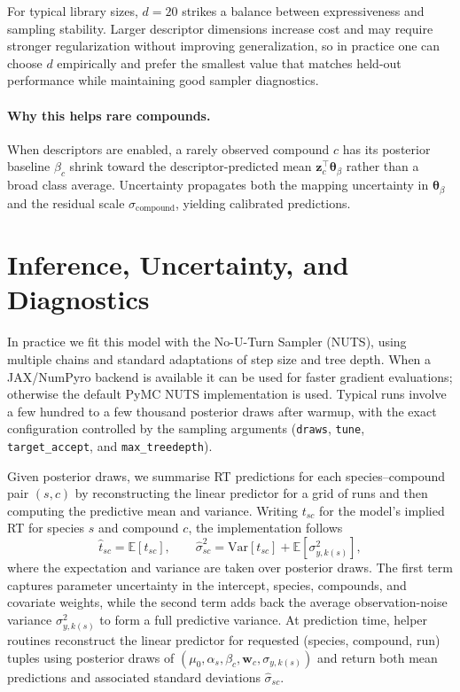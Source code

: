 \documentclass[11pt]{article}
\begin{document}
For typical library sizes, $d=20$ strikes a balance between expressiveness and sampling
stability. Larger descriptor dimensions increase cost and may require stronger
regularization without improving generalization, so in practice one can choose $d$
empirically and prefer the smallest value that matches held-out performance while
maintaining good sampler diagnostics.

\paragraph{Why this helps rare compounds.}
When descriptors are enabled, a rarely observed compound $c$ has its posterior
baseline $\beta_c$ shrink toward the descriptor-predicted mean
$\bm{z}_c^{\top}\bm{\theta}_\beta$ rather than a broad class average. Uncertainty
propagates both the mapping uncertainty in $\bm{\theta}_\beta$ and the residual scale
$\sigma_{\mathrm{compound}}$, yielding calibrated predictions.

\section{Inference, Uncertainty, and Diagnostics}

In practice we fit this model with the No-U-Turn Sampler (NUTS), using multiple chains
and standard adaptations of step size and tree depth. When a JAX/NumPyro backend is
available it can be used for faster gradient evaluations; otherwise the default PyMC
NUTS implementation is used. Typical runs involve a few hundred to a few thousand
posterior draws after warmup, with the exact configuration controlled by the sampling
arguments (\texttt{draws}, \texttt{tune}, \texttt{target\_accept}, and
\texttt{max\_treedepth}).

Given posterior draws, we summarise RT predictions for each species--compound pair
$(s,c)$ by reconstructing the linear predictor for a grid of runs and then computing
the predictive mean and variance. Writing $t_{sc}$ for the model's implied RT for
species $s$ and compound $c$, the implementation follows
\begin{equation}
  \hat{t}_{sc}=\mathbb{E}[t_{sc}],
  \qquad
  \hat{\sigma}^2_{sc}=\mathrm{Var}[t_{sc}]+\mathbb{E}[\sigma^2_{y,k(s)}],
\end{equation}
where the expectation and variance are taken over posterior draws. The first term
captures parameter uncertainty in the intercept, species, compounds, and covariate
weights, while the second term adds back the average observation-noise variance
$\sigma^2_{y,k(s)}$ to form a full predictive variance. At prediction time, helper routines
reconstruct the linear predictor for requested (species, compound, run) tuples using
posterior draws of $(\mu_0,\alpha_s,\beta_c,\bm{w}_c,\sigma_{y,k(s)})$ and return both mean
predictions and associated standard deviations $\hat{\sigma}_{sc}$.
\end{document}
